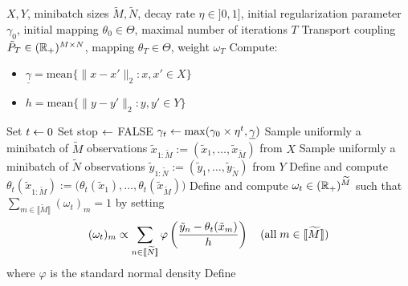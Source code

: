 \begin{algorithm}[h]
  \caption{\textit{Master optimal transport algorithm.}
  }
  \label{algo:SGD}
  \begin{algorithmic}
    \REQUIRE  $X, Y$,  minibatch sizes  $\widetilde{M}, \widetilde{N}$,  decay
    rate  $\eta \in  ]0,1]$,  initial  regularization parameter  $\gamma_{0}$,
    initial mapping $\theta_{0} \in \Theta$, maximal number of iterations $T$
    \ENSURE  Transport coupling  $\tilde{P}_{T}  \in (\mathbb{R}_{+})^{M\times  N}$,
    mapping $\theta_{T}\in\Theta$, weight $\omega_{T}$
    \STATE Compute: 
    \begin{itemize}
    \item $\underline{\gamma} = \text{mean} \{\|x -  x'\|_{2} : x, x' \in X\}$
    \item $h  = \text{mean}  \{\|y -  y'\|_{2} : y,  y' \in  Y\}$ 
    \end{itemize}
    \STATE Set $t \leftarrow 0$
    \STATE Set stop $\leftarrow$ FALSE
    \STATE
    $\gamma_{t} \leftarrow \max(\gamma_{0} \times \eta^{t}, \underline{\gamma})$
    \STATE  Sample  uniformly  a  minibatch  of  $\widetilde{M}$  observations
    $\tilde{x}_{1:\widetilde{M}}       :=        (\tilde{x}_{1},       \ldots,
    \tilde{x}_{\widetilde{M}})$ from $X$
    \STATE  Sample  uniformly  a  minibatch  of  $\widetilde{N}$  observations
    $\tilde{y}_{1:\widetilde{N}}       :=        (\tilde{y}_{1},       \ldots,
    \tilde{y}_{\widetilde{N}})$ from $Y$
    \STATE                 Define                  and                 compute
    $\theta_{t}(\tilde{x}_{1:\widetilde{M}})  := \big(\theta_{t}(\tilde{x}_1),
    \ldots, \theta_{t}(\tilde{x}_{\widetilde{M}})\big)$
    \STATE Define and compute $\omega_{t} \in (\mathbb{R}_{+})^{\widetilde{M}}$ such
    that $\sum_{m \in \llbracket\widetilde{M}\rrbracket} (\omega_{t})_{m} = 1$
    by setting
    \begin{equation*}
      (\omega_{t})_{m}        \propto       \sum_{n        \in       \llbracket\widetilde{N}\rrbracket}
      \varphi\left(\frac{\tilde{y}_{n}    -   \theta_{t}(\tilde{x}_{m})}{h}\right)
      \quad (\text{all\;} m\in \llbracket\widetilde{M}\rrbracket) 
    \end{equation*}
    where $\varphi$ is the standard normal density
    \STATE                                                              Define

\end{algorithmic}
\end{algorithm}
